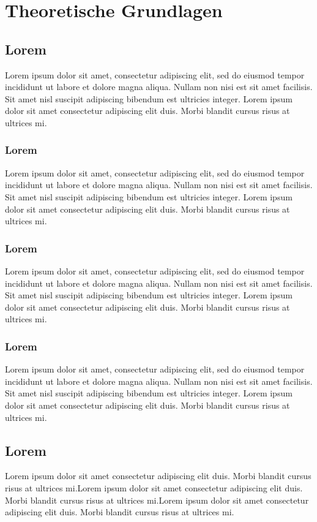 \section{Theoretische Grundlagen}\label{theoretische_grundlagen}\thispagestyle{FooBar}
\subsection{Lorem}
Lorem ipsum dolor sit amet, consectetur adipiscing elit, sed do eiusmod tempor incididunt ut labore et dolore magna aliqua. Nullam non nisi est sit amet facilisis. Sit amet nisl suscipit adipiscing bibendum est ultricies integer. Lorem ipsum dolor sit amet consectetur adipiscing elit duis. Morbi blandit cursus risus at ultrices mi. 
\subsubsection{Lorem}
Lorem ipsum dolor sit amet, consectetur adipiscing elit, sed do eiusmod tempor incididunt ut labore et dolore magna aliqua. Nullam non nisi est sit amet facilisis. Sit amet nisl suscipit adipiscing bibendum est ultricies integer. Lorem ipsum dolor sit amet consectetur adipiscing elit duis. Morbi blandit cursus risus at ultrices mi. 
\subsubsection{Lorem}
Lorem ipsum dolor sit amet, consectetur adipiscing elit, sed do eiusmod tempor incididunt ut labore et dolore magna aliqua. Nullam non nisi est sit amet facilisis. Sit amet nisl suscipit adipiscing bibendum est ultricies integer. Lorem ipsum dolor sit amet consectetur adipiscing elit duis. Morbi blandit cursus risus at ultrices mi.
\subsubsection{Lorem}
Lorem ipsum dolor sit amet, consectetur adipiscing elit, sed do eiusmod tempor incididunt ut labore et dolore magna aliqua. Nullam non nisi est sit amet facilisis. Sit amet nisl suscipit adipiscing bibendum est ultricies integer. Lorem ipsum dolor sit amet consectetur adipiscing elit duis. Morbi blandit cursus risus at ultrices mi. 
\newpage
\subsection{Lorem}
Lorem ipsum dolor sit amet consectetur adipiscing elit duis. Morbi blandit cursus risus at ultrices mi.Lorem ipsum dolor sit amet consectetur adipiscing elit duis. Morbi blandit cursus risus at ultrices mi.Lorem ipsum dolor sit amet consectetur adipiscing elit duis. Morbi blandit cursus risus at ultrices mi.
